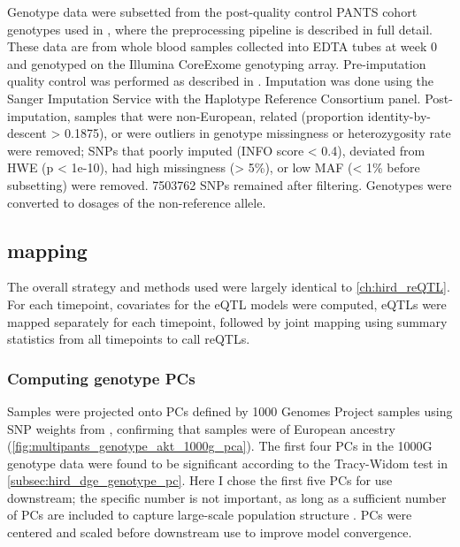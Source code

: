 Genotype data were subsetted from the post-quality control \gls{PANTS} cohort genotypes used in \textcite{sazonovs2019HLADQA105Carriage},
where the preprocessing pipeline is described in full detail.
These data are from whole blood samples collected into EDTA tubes at week 0 and genotyped on the Illumina CoreExome genotyping array.
Pre-imputation quality control was performed as described in \textcite{delange2017GenomewideAssociationStudy}.
Imputation was done using the Sanger Imputation Service with the Haplotype Reference Consortium panel.
Post-imputation, samples that were non-European, related (proportion identity-by-descent > 0.1875), or were outliers in genotype missingness or heterozygosity rate were removed;
\glspl{SNP} that poorly imputed (INFO score < 0.4), deviated from \gls{HWE} (p < 1e-10), had high missingness (> 5\%), or low \gls{MAF} (< 1\% before subsetting) were removed.
\num{7503762} \glspl{SNP} remained after filtering.
Genotypes were converted to dosages of the non-reference allele.

\subsection{ mapping}

The overall strategy and methods used were largely identical to \autoref{ch:hird_reQTL}.
For each timepoint, covariates for the \gls{eQTL} models were computed, \glspl{eQTL} were mapped separately for each timepoint, followed by joint mapping using summary statistics from all timepoints to call \glspl{reQTL}.

\subsubsection{Computing genotype PCs}

Samples were projected onto \glspl{PC} defined by 1000 Genomes Project samples using \gls{SNP} weights from ,
confirming that samples were of European ancestry (\autoref{fig:multipants_genotype_akt_1000g_pca}).
The first four \glspl{PC} in the 1000G genotype data were found to be significant according to the Tracy-Widom test in \autoref{subsec:hird_dge_genotype_pc}.
Here I chose the first five \glspl{PC} for use downstream;
the specific number is not important, as long as a sufficient number of \glspl{PC} are included to capture large-scale population structure \autocite{price2006PrincipalComponentsAnalysis}.
\glspl{PC} were centered and scaled before downstream use to improve model convergence.


